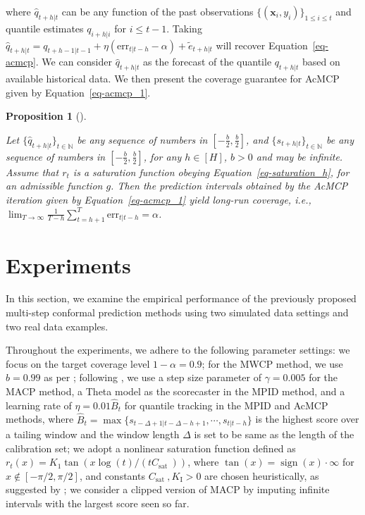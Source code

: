 \documentclass[
  11pt,
  a4paper,
]{article}
\theoremstyle{plain}
\newtheorem{proposition}{Proposition}[section]
\theoremstyle{remark}
\begin{document}
where \(\hat{q}_{t+h|t}\) can be any function of the past observations
\(\{(\bm{x}_i, y_i)\}_{1 \leq i \leq t}\) and quantile estimates
\(q_{i+h|i}\) for \(i \leq t-1\). Taking
\(\hat{q}_{t+h|t}=q_{t+h-1|t-1}+\eta \left(\mathrm{err}_{t|t-h}-\alpha\right)+\tilde{e}_{t+h|t}\)
will recover Equation~\ref{eq-acmcp}. We can consider
\(\hat{q}_{t+h|t}\) as the forecast of the quantile \(q_{t+h|t}\) based
on available historical data. We then present the coverage guarantee for
AcMCP given by Equation~\ref{eq-acmcp_1}.

\begin{proposition}[]\protect\hypertarget{prp-cov_acmcp}{}\label{prp-cov_acmcp}

Let \(\{\hat{q}_{t+h|t}\}_{t\in\mathbb{N}}\) be any sequence of numbers
in \([-\frac{b}{2}, \frac{b}{2}]\), and
\(\{s_{t+h|t}\}_{t\in\mathbb{N}}\) be any sequence of numbers in
\([-\frac{b}{2},\frac{b}{2}]\), for any \(h\in[H]\), \(b>0\) and may be
infinite. Assume that \(r_t\) is a saturation function obeying
Equation~\ref{eq-saturation_h}, for an admissible function \(g\). Then
the prediction intervals obtained by the AcMCP iteration given by
Equation~\ref{eq-acmcp_1} yield long-run coverage, i.e.,
\(\lim _{T \rightarrow \infty} \frac{1}{T-h} \sum_{t=h+1}^T \mathrm{err}_{t|t-h} = \alpha\).

\end{proposition}

\section{Experiments}\label{experiments}

In this section, we examine the empirical performance of the previously
proposed multi-step conformal prediction methods using two simulated
data settings and two real data examples.

Throughout the experiments, we adhere to the following parameter
settings: we focus on the target coverage level \(1-\alpha=0.9\); for
the MWCP method, we use \(b=0.99\) as per \textcite{barber2023};
following \textcite{angelopoulos2024}, we use a step size parameter of
\(\gamma=0.005\) for the MACP method, a Theta model as the scorecaster
in the MPID method, and a learning rate of \(\eta=0.01\hat{B}_t\) for
quantile tracking in the MPID and AcMCP methods, where
\(\hat{B}_t=\max\{s_{t-\Delta+1|t-\Delta-h+1},\cdots,s_{t|t-h}\}\) is
the highest score over a tailing window and the window length \(\Delta\)
is set to be same as the length of the calibration set; we adopt a
nonlinear saturation function defined as
\(r_t(x)=K_1 \tan \left(x \log (t) /\left(t C_{\text {sat }}\right)\right)\),
where \(\tan (x)=\operatorname{sign}(x) \cdot \infty\) for
\(x \notin[-\pi / 2, \pi / 2]\), and constants
\(C_{\text {sat }}, K_{\mathrm{I}}>0\) are chosen heuristically, as
suggested by \textcite{angelopoulos2024}; we consider a clipped version
of MACP by imputing infinite intervals with the largest score seen so
far.
\end{document}
